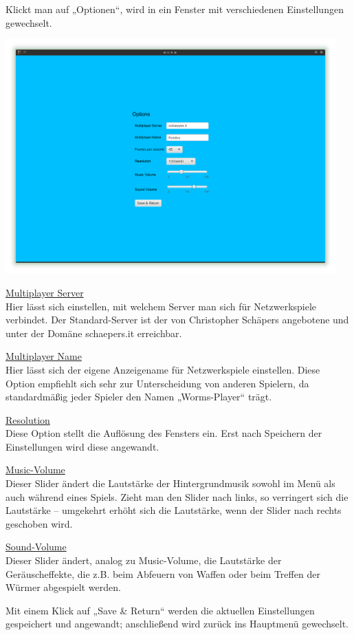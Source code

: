 \documentclass{scrreprt}
\begin{document}
Klickt man auf „Optionen“, wird in ein Fenster mit verschiedenen Einstellungen gewechselt.

\includegraphics[height=9cm]{Screenshot2.png}

\underline{Multiplayer Server}\\
Hier lässt sich einstellen, mit welchem Server man sich für Netzwerkspiele verbindet. Der Standard-Server ist der von
Christopher Schäpers angebotene und unter der Domäne schaepers.it erreichbar.

\underline{Multiplayer Name}\\
Hier lässt sich der eigene Anzeigename für Netzwerkspiele einstellen. Diese Option empfiehlt sich sehr zur Unterscheidung von anderen Spielern, da standardmäßig jeder Spieler den Namen „Worms-Player“ trägt.

\underline{Resolution}\\
Diese Option stellt die Auflösung des Fensters ein. Erst nach Speichern der Einstellungen wird diese angewandt.

\underline{Music-Volume}\\
Dieser Slider ändert die Lautstärke der Hintergrundmusik sowohl im Menü als auch während eines Spiels. Zieht man den Slider nach links, so verringert sich die Lautstärke – umgekehrt erhöht sich die Lautstärke, wenn der Slider nach rechts geschoben wird.

\underline{Sound-Volume}\\
Dieser Slider ändert, analog zu Music-Volume, die Lautstärke der Geräuscheffekte, die z.B. beim Abfeuern von Waffen oder beim Treffen
der Würmer abgespielt werden.

Mit einem Klick auf „Save \& Return“ werden die aktuellen Einstellungen gespeichert und angewandt; anschließend wird zurück ins Hauptmenü gewechselt.
\end{document}
